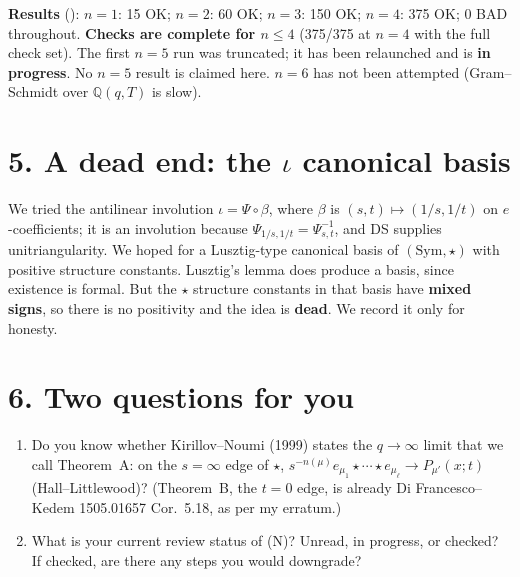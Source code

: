 \documentclass[10pt]{article}
\newcommand{\file}[1]{{\footnotesize\texttt{\detokenize{#1}}}}
\begin{document}
\smallskip
\noindent\textbf{Results} (\file{ds_from_N_5.log}): $n=1$: 15 OK; $n=2$: 60 OK; $n=3$: 150 OK; $n=4$: 375 OK; 0 BAD throughout.
\textbf{Checks are complete for $n\le4$} (375/375 at $n=4$ with the full check set).
The first $n=5$ run was truncated; it has been relaunched and is \textbf{in progress}. No $n=5$ result is claimed here. $n=6$ has not been attempted (Gram--Schmidt over $\mathbb Q(q,T)$ is slow).

\section*{5. A dead end: the $\iota$ canonical basis}
We tried the antilinear involution $\iota=\Psi\circ\beta$, where $\beta$ is $(s,t)\mapsto(1/s,1/t)$ on $e$-coefficients; it is an involution because $\Psi_{1/s,1/t}=\Psi_{s,t}^{-1}$, and DS supplies unitriangularity. We hoped for a Lusztig-type canonical basis of $(\mathrm{Sym},\star)$ with positive structure constants. Lusztig's lemma does produce a basis, since existence is formal. But the $\star$ structure constants in that basis have \textbf{mixed signs}, so there is no positivity and the idea is \textbf{dead}. We record it only for honesty.

\section*{6. Two questions for you}
\begin{enumerate}
\item[(a)] Do you know whether Kirillov--Noumi (1999) states the $q\to\infty$ limit that we call Theorem~A: on the $s=\infty$ edge of $\star$, $s^{-n(\mu)}e_{\mu_1}\star\cdots\star e_{\mu_\ell}\to P_{\mu'}(x;t)$ (Hall--Littlewood)? (Theorem~B, the $t=0$ edge, is already Di Francesco--Kedem 1505.01657 Cor.~5.18, as per my erratum.)
\item[(b)] What is your current review status of (N)? Unread, in progress, or checked? If checked, are there any steps you would downgrade?
\end{enumerate}
\end{document}
